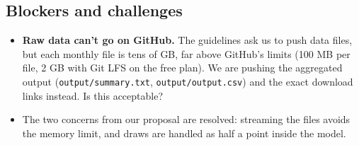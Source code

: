 \documentclass[11pt,a4paper]{article}
\begin{document}
\subsection*{Blockers and challenges}
\begin{itemize}
\item \textbf{Raw data can't go on GitHub.} The guidelines ask us to push data files, but each
  monthly file is tens of GB, far above GitHub's limits (100 MB per file, 2 GB with Git LFS on the
  free plan). We are pushing the aggregated output (\texttt{output/summary.txt},
  \texttt{output/output.csv}) and the exact download links instead. Is this acceptable?
\item The two concerns from our proposal are resolved: streaming the files avoids the memory limit,
  and draws are handled as half a point inside the model.
\end{itemize}
\end{document}
